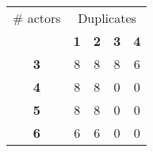 \begin{tabular}{ | c | c | c | c | c | }
\hline
\# actors & \multicolumn{4}{|c|}{Duplicates} \\ \cline{2-5}
 & {\bf1} & {\bf2} & {\bf3} & {\bf4} \\ \hline
{\bf 3} & 8 & 8 & 8 & 6 \\ \hline
{\bf 4} & 8 & 8 & 0 & 0 \\ \hline
{\bf 5} & 8 & 8 & 0 & 0 \\ \hline
{\bf 6} & 6 & 6 & 0 & 0 \\ \hline
\end{tabular}
